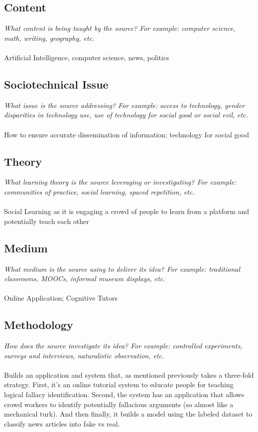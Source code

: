 \documentclass[12pt, final]{article}
\begin{document}
\subsection{Content}
\textit{What content is being taught by the source? For example: computer science, math, writing, geography, etc.}
\\
\\
Artificial Intelligence, computer science, news, politics

\subsection{Sociotechnical Issue}
\textit{What issue is the source addressing? For example: access to technology, gender disparities in technology use, use of technology for social good or social evil, etc.}
\\
\\
How to ensure accurate dissemination of information; technology for social good

\subsection{Theory}
\textit{What learning theory is the source leveraging or investigating? For example: communities of practice, social learning, spaced repetition, etc.}
\\
\\
Social Learning as it is engaging a crowd of people to learn from a platform and potentially teach each other

\subsection{Medium}
\textit{What medium is the source using to deliver its idea? For example: traditional classrooms, MOOCs, informal museum displays, etc.}
\\
\\
Online Application; Cognitive Tutors

\subsection{Methodology}
\textit{How does the source investigate its idea? For example: controlled experiments, surveys and interviews, naturalistic observation, etc.}
\\
\\
Builds an application and system that, as mentioned previously takes a three-fold strategy. First, it's an online tutorial system to educate people for teaching logical fallacy identification. Second, the system has an application that allows crowd workers to identify potentially fallacious arguments (so almost like a mechanical turk). And then finally, it builds a model using the labeled dataset to classify news articles into fake vs real.
\end{document}
